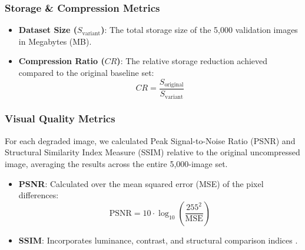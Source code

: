 \documentclass[12pt, a4paper]{article}
\begin{document}
\subsubsection{Storage \& Compression Metrics}
\begin{itemize}
    \item \textbf{Dataset Size ($S_{\text{variant}}$)}: The total storage size of the 5,000 validation images in Megabytes (MB).
    \item \textbf{Compression Ratio ($CR$)}: The relative storage reduction achieved compared to the original baseline set:
    \begin{equation}
    CR = \frac{S_{\text{original}}}{S_{\text{variant}}}
    \label{eq:cr}
    \end{equation}
\end{itemize}

\subsubsection{Visual Quality Metrics}
For each degraded image, we calculated Peak Signal-to-Noise Ratio (PSNR) and Structural Similarity Index Measure (SSIM) relative to the original uncompressed image, averaging the results across the entire 5,000-image set.
\begin{itemize}
    \item \textbf{PSNR}: Calculated over the mean squared error (MSE) of the pixel differences:
    \begin{equation}
    \text{PSNR} = 10 \cdot \log_{10}\left(\frac{255^2}{\text{MSE}}\right)
    \label{eq:psnr}
    \end{equation}
    \item \textbf{SSIM}: Incorporates luminance, contrast, and structural comparison indices \cite{wang2004}.
\end{itemize}
\end{document}
